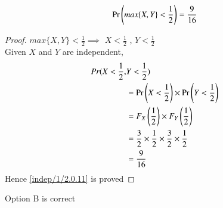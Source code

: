    \begin{lemma}
   \begin{align}
       \Pr\brak{{max\{X,Y\}<\frac{1}{2}}} = \frac{9}{16}\label{indep/1/2.0.11}
   \end{align}
   \end{lemma}
   \begin{proof}
   \({max\{X,Y\}}<\frac{1}{2} \implies\) \(X<\frac{1}{2}\) , \(Y<\frac{1}{2}\)\\
   Given \(X\) and \(Y\) are independent,
   \begin{align}
       Pr(X<\frac{1}{2},&Y<\frac{1}{2})\\
       &=\Pr\left(X <\frac{1}{2}\right)\times \Pr\left(Y <\frac{1}{2}\right)\\
       &=F_X\left(\frac{1}{2}\right) \times F_Y\left(\frac{1}{2}\right)\\
      &=\frac{3}{2}\times\frac{1}{2}\times\frac{3}{2}\times\frac{1}{2}\\
       &=\frac{9}{16}
   \end{align}
   Hence \eqref{indep/1/2.0.11} is proved
   \end{proof}
   Option B is correct